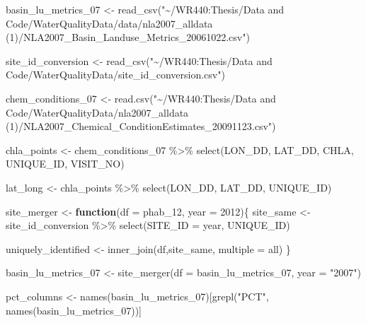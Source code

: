 \documentclass[
]{book}
\newenvironment{Shaded}{\begin{snugshade}}{\end{snugshade}}
\newcommand{\AttributeTok}[1]{\textcolor[rgb]{0.77,0.63,0.00}{#1}}
\newcommand{\ControlFlowTok}[1]{\textcolor[rgb]{0.13,0.29,0.53}{\textbf{#1}}}
\newcommand{\FunctionTok}[1]{\textcolor[rgb]{0.00,0.00,0.00}{#1}}
\newcommand{\NormalTok}[1]{#1}
\newcommand{\OtherTok}[1]{\textcolor[rgb]{0.56,0.35,0.01}{#1}}
\newcommand{\SpecialCharTok}[1]{\textcolor[rgb]{0.00,0.00,0.00}{#1}}
\newcommand{\StringTok}[1]{\textcolor[rgb]{0.31,0.60,0.02}{#1}}
\begin{document}
\begin{Shaded}
\begin{Highlighting}[]
\NormalTok{basin\_lu\_metrics\_07 }\OtherTok{\textless{}{-}} \FunctionTok{read\_csv}\NormalTok{(}\StringTok{"\textasciitilde{}/WR440:Thesis/Data and Code/WaterQualityData/data/nla2007\_alldata (1)/NLA2007\_Basin\_Landuse\_Metrics\_20061022.csv"}\NormalTok{)}

\NormalTok{site\_id\_conversion }\OtherTok{\textless{}{-}} \FunctionTok{read\_csv}\NormalTok{(}\StringTok{"\textasciitilde{}/WR440:Thesis/Data and Code/WaterQualityData/site\_id\_conversion.csv"}\NormalTok{)}


\NormalTok{chem\_conditions\_07 }\OtherTok{\textless{}{-}} \FunctionTok{read.csv}\NormalTok{(}\StringTok{"\textasciitilde{}/WR440:Thesis/Data and Code/WaterQualityData/nla2007\_alldata (1)/NLA2007\_Chemical\_ConditionEstimates\_20091123.csv"}\NormalTok{)}


\NormalTok{chla\_points }\OtherTok{\textless{}{-}}\NormalTok{ chem\_conditions\_07 }\SpecialCharTok{\%\textgreater{}\%}
  \FunctionTok{select}\NormalTok{(LON\_DD, LAT\_DD, CHLA, UNIQUE\_ID, VISIT\_NO)}

\NormalTok{lat\_long }\OtherTok{\textless{}{-}}\NormalTok{ chla\_points }\SpecialCharTok{\%\textgreater{}\%}
  \FunctionTok{select}\NormalTok{(LON\_DD, LAT\_DD, UNIQUE\_ID)}

\NormalTok{site\_merger }\OtherTok{\textless{}{-}} \ControlFlowTok{function}\NormalTok{(}\AttributeTok{df =}\NormalTok{ phab\_12, }\AttributeTok{year =} \StringTok{\textquotesingle{}2012\textquotesingle{}}\NormalTok{)\{}
\NormalTok{  site\_same }\OtherTok{\textless{}{-}}\NormalTok{ site\_id\_conversion }\SpecialCharTok{\%\textgreater{}\%}
    \FunctionTok{select}\NormalTok{(}\AttributeTok{SITE\_ID =}\NormalTok{ year,}
\NormalTok{           UNIQUE\_ID)}
  
\NormalTok{  uniquely\_identified }\OtherTok{\textless{}{-}} \FunctionTok{inner\_join}\NormalTok{(df,site\_same, }
                                    \AttributeTok{multiple =} \StringTok{\textquotesingle{}all\textquotesingle{}}\NormalTok{)}
\NormalTok{\}}
  
\NormalTok{basin\_lu\_metrics\_07 }\OtherTok{\textless{}{-}} \FunctionTok{site\_merger}\NormalTok{(}\AttributeTok{df =}\NormalTok{ basin\_lu\_metrics\_07, }\AttributeTok{year =} \StringTok{"2007"}\NormalTok{)}

\NormalTok{pct\_columns }\OtherTok{\textless{}{-}} \FunctionTok{names}\NormalTok{(basin\_lu\_metrics\_07)[}\FunctionTok{grepl}\NormalTok{(}\StringTok{"PCT"}\NormalTok{, }\FunctionTok{names}\NormalTok{(basin\_lu\_metrics\_07))]}


\end{Highlighting}
\end{Shaded}
\end{document}
